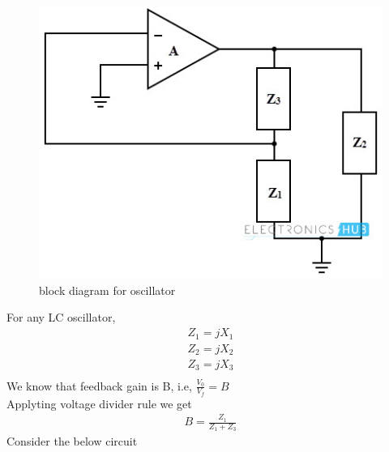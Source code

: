 \begin{enumerate}[label=\thesubsection.\arabic*.,ref=\thesubsection.\theenumi]
\begin{figure}[!ht]
    \begin{center}
		
		\includegraphics[scale=0.8]{./figs/blc.jpg}
	\end{center}
\caption{block diagram for oscillator}
\label{fig:block2}
\end{figure}

For any LC oscillator, 
\begin{align}
    Z_1 = jX_1\\
    Z_2 = jX_2\\
    Z_3 = jX_3\\
\end{align}
We know that feedback gain is B, i.e, $\frac{V_0}{V_f} = B$\\
Applyting voltage divider rule we get
\begin{align}
    B = \frac{Z_1}{Z_1 + Z_3}
\end{align}
Consider the below circuit
\begin{figure}[!ht]
    \begin{center}
		

\end{center}
\end{figure}
\end{enumerate}
